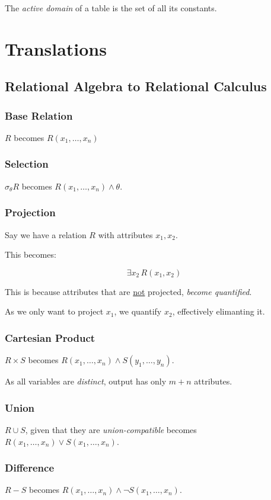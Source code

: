 \documentclass{article}
\begin{document}
The \textit{active domain} of a table is the set of all its constants.

\section{Translations}

\subsection{Relational Algebra to Relational Calculus}

\subsubsection{Base Relation}

$R$ becomes $R(x_1, \ldots, x_n)$

\subsubsection{Selection}

$\sigma_{\theta} R$ becomes $R(x_1, \ldots, x_n) \wedge \theta$.

\subsubsection{Projection}

Say we have a relation $R$ with attributes $x_1, x_2$.

This becomes:

\[ \exists x_2\, R(x_1, x_2)\]

This is because attributes that are \underline{not} projected, \textit{become quantified}.

As we only want to project $x_1$, we quantify $x_2$, effectively elimanting it.

\subsubsection{Cartesian Product}

$R \times S$ becomes $R(x_1, \ldots, x_n) \wedge S(y_1, \ldots, y_n)$.

As all variables are \textit{distinct}, output has only $m + n$ attributes.

\subsubsection{Union}

$R \cup S$, given that they are \textit{union-compatible} becomes $R(x_1, \ldots, x_n) \vee S(x_1, \ldots, x_n)$.

\subsubsection{Difference}

$R - S$ becomes $R(x_1, \ldots, x_n) \wedge \neg S(x_1, \ldots, x_n)$.
\end{document}
